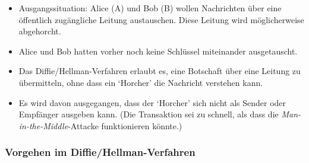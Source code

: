 \begin{itemize}
    \item Ausgangssituation: Alice (A) und Bob (B) wollen Nachrichten über
    eine öffentlich zugängliche Leitung austauschen. Diese Leitung wird
    möglicherweise abgehorcht.
    \item Alice und Bob hatten vorher noch keine Schlüssel miteinander ausgetauscht.
    \item Das Diffie/Hellman-Verfahren erlaubt es, eine Botschaft über eine
    Leitung zu übermitteln, ohne dass ein `Horcher' die Nachricht verstehen kann.
    \item Es wird davon ausgegangen, dass der `Horcher' sich nicht als Sender
    oder Empfänger ausgeben kann. (Die Transaktion sei zu schnell, als
    dass die \emph{Man-in-the-Middle}-Attacke funktionieren könnte.)
\end{itemize}

\subsubsection*{Vorgehen im Diffie/Hellman-Verfahren}

